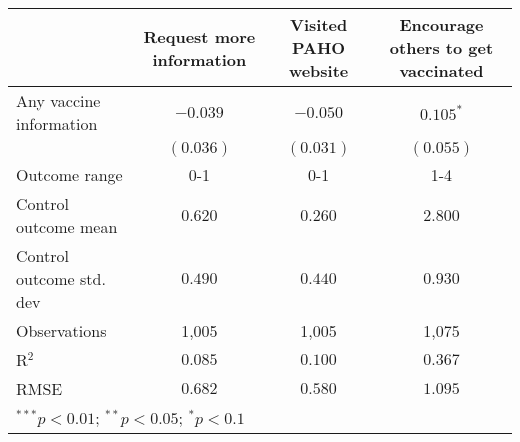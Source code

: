 \begin{table}
\begin{center}
\begin{tabular}{l c c c}
\hline
 & Request more information & Visited PAHO website & Encourage others to get vaccinated \\
\hline
Any vaccine information  & $-0.039$  & $-0.050$  & $0.105^{*}$ \\
                         & $(0.036)$ & $(0.031)$ & $(0.055)$   \\
\hline
Outcome range            & 0-1       & 0-1       & 1-4         \\
Control outcome mean     & $0.620$   & $0.260$   & $2.800$     \\
Control outcome std. dev & $0.490$   & $0.440$   & $0.930$     \\
Observations             & 1,005     & 1,005     & 1,075       \\
R$^{2}$                  & $0.085$   & $0.100$   & $0.367$     \\
RMSE                     & $0.682$   & $0.580$   & $1.095$     \\
\hline
\multicolumn{4}{l}{\scriptsize{$^{***}p<0.01$; $^{**}p<0.05$; $^{*}p<0.1$}}
\end{tabular}
\caption{}
\label{table:Tables and Figures/SI_table21_anyinfo_Mexico_behav}
\end{center}
\end{table}
